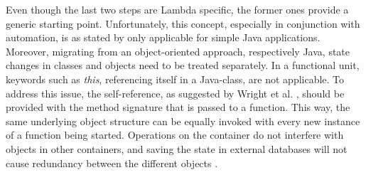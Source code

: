 \documentclass[a4paper,twoside,11pt, pagesize]{scrartcl}
\begin{document}
\begin{spacing}{1.2}
Even though the last two steps are Lambda specific, the former ones provide a generic starting point. Unfortunately, this concept, especially in conjunction with automation, is as stated by \cite{spillner2017Java} only applicable for simple Java applications. Moreover, migrating from an object-oriented approach, respectively Java, state changes in classes and objects need to be treated separately. In a functional unit, keywords such as \textit{this}, referencing itself in a Java-class, are not applicable. To address this issue, the self-reference, as suggested by Wright et al. \cite{wright1998compiling}, should be provided with the method signature that is passed to a function. This way, the same underlying object structure can be equally invoked with every new instance of a function being started. Operations on the container do not interfere with objects in other containers, and saving the state in external databases will not cause redundancy between the different objects \cite{spillner2017Java}.\\\\ 

\end{spacing}
\end{document}
